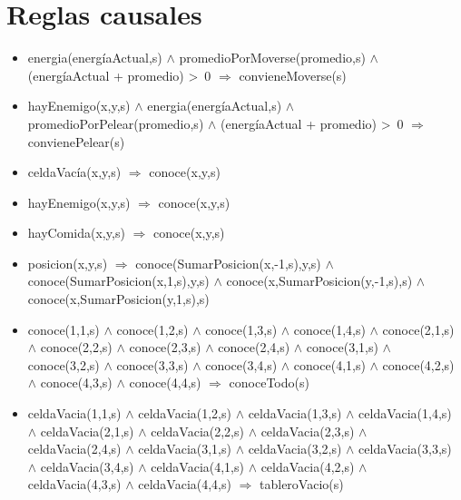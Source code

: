 \section{Reglas causales}

\begin{itemize}

\item  energia(energíaActual,s)
$\land$ promedioPorMoverse(promedio,s) $\land$ (energíaActual + promedio) >~0
$\Rightarrow$ convieneMoverse(s)

\item hayEnemigo(x,y,s) $\land$ energia(energíaActual,s)
$\land$ promedioPorPelear(promedio,s) $\land$ (energíaActual + promedio) >~0
$\Rightarrow$ convienePelear(s)

\item celdaVacía(x,y,s) $\Rightarrow$
 conoce(x,y,s)
 
\item hayEnemigo(x,y,s) $\Rightarrow$
 conoce(x,y,s)

\item hayComida(x,y,s) $\Rightarrow$
 conoce(x,y,s)

\item posicion(x,y,s) $\Rightarrow$
 conoce(SumarPosicion(x,-1,s),y,s) $\land$  
 conoce(SumarPosicion(x,1,s),y,s) $\land$ 
 conoce(x,SumarPosicion(y,-1,s),s) $\land$ 
 conoce(x,SumarPosicion(y,1,s),s) 

\item conoce(1,1,s) $\land$ conoce(1,2,s) $\land$ 
 conoce(1,3,s) $\land$ conoce(1,4,s) $\land$ 
 \newline 
 conoce(2,1,s) $\land$ conoce(2,2,s) $\land$ 
 conoce(2,3,s) $\land$ conoce(2,4,s) $\land$ 
 \newline 
 conoce(3,1,s) $\land$ conoce(3,2,s) $\land$ 
 conoce(3,3,s) $\land$ conoce(3,4,s) $\land$ 
 \newline 
 conoce(4,1,s) $\land$ conoce(4,2,s) $\land$ 
 conoce(4,3,s) $\land$ conoce(4,4,s) 
 \newline
 $\Rightarrow$ conoceTodo(s)

\item celdaVacia(1,1,s) $\land$ celdaVacia(1,2,s) $\land$ 
 celdaVacia(1,3,s) $\land$ celdaVacia(1,4,s) $\land$ 
 \newline 
 celdaVacia(2,1,s) $\land$ celdaVacia(2,2,s) $\land$ 
 celdaVacia(2,3,s) $\land$ celdaVacia(2,4,s) $\land$
 \newline  
 celdaVacia(3,1,s) $\land$ celdaVacia(3,2,s) $\land$ 
 celdaVacia(3,3,s) $\land$ celdaVacia(3,4,s) $\land$ 
 \newline 
 celdaVacia(4,1,s) $\land$ celdaVacia(4,2,s) $\land$ 
 celdaVacia(4,3,s) $\land$ celdaVacia(4,4,s) 
 $\Rightarrow$ tableroVacio(s)
 

\end{itemize}
